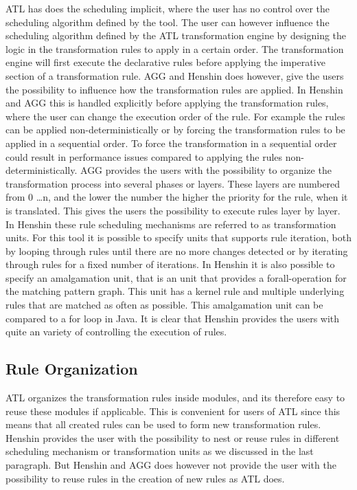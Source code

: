 ATL has does the scheduling implicit, where the user has no control over the
scheduling algorithm defined by the tool. The user can however influence the scheduling
algorithm defined by the ATL transformation engine by designing the logic in the
transformation rules to apply in a certain order. The transformation
engine will first execute the declarative rules before applying the imperative
section of a transformation rule. AGG and Henshin does however, give the
users the possibility to influence how the transformation rules are applied. 
In Henshin and AGG this is handled explicitly before applying the transformation
rules, where the user can change the execution order of the rule.
For example the rules can be applied non-deterministically or by forcing the
transformation rules to be applied in a sequential order. To force the
transformation in a sequential order could result in performance issues compared
to applying the rules non-deterministically. AGG provides the users with the
possibility to organize the transformation process into several phases or
layers. These layers are numbered from 0 \ldots n, and the lower the number the
higher the priority for the rule, when it is translated. This gives the users
the possibility to execute rules layer by layer. In Henshin these rule scheduling
mechanisms are referred to as transformation units. For this tool it is possible
to specify units that supports rule iteration, both by looping through rules
until there are no more changes detected or by iterating through rules for a
fixed number of iterations. In Henshin it is also possible to specify an
amalgamation unit, that is an unit that provides a forall-operation for the
matching pattern graph. This unit has a kernel rule and multiple underlying
rules that are matched as often as possible. This amalgamation unit can be
compared to a for loop in Java. It is clear that Henshin provides the users with
quite an variety of controlling the execution of rules.

\subsection{Rule Organization}

ATL organizes the transformation rules inside modules, and its therefore easy to
reuse these modules if applicable. This is convenient for
users of ATL since this means that all created rules can be used to form new
transformation rules. Henshin provides the user with the possibility to nest or 
reuse rules in different scheduling mechanism or transformation units
as we discussed in the last paragraph. But Henshin and AGG does however not
provide the user with the possibility to reuse rules in the creation of new
rules as ATL does. 

